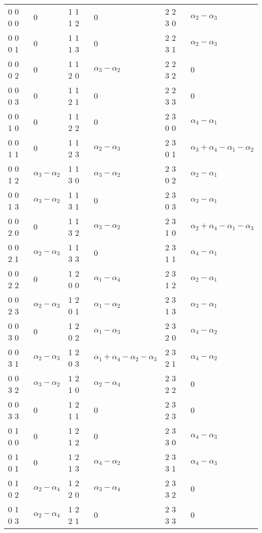 \begin{longtable}{|l|l|l|l|l|l|}
0 0 0 0 & \(0\) & 1 1 1 2 & \(0\) & 2 2 3 0 & \(\alpha_2 - \alpha_3\) \\ 
0 0 0 1 & \(0\) & 1 1 1 3 & \(0\) & 2 2 3 1 & \(\alpha_2 - \alpha_3\) \\ 
0 0 0 2 & \(0\) & 1 1 2 0 & \(\alpha_3 - \alpha_2\) & 2 2 3 2 & \(0\) \\ 
0 0 0 3 & \(0\) & 1 1 2 1 & \(0\) & 2 2 3 3 & \(0\) \\ 
0 0 1 0 & \(0\) & 1 1 2 2 & \(0\) & 2 3 0 0 & \(\alpha_4 - \alpha_1\) \\ 
0 0 1 1 & \(0\) & 1 1 2 3 & \(\alpha_2 - \alpha_3\) & 2 3 0 1 & \(\alpha_3 + \alpha_4 - \alpha_1 - \alpha_2\) \\ 
0 0 1 2 & \(\alpha_3 - \alpha_2\) & 1 1 3 0 & \(\alpha_3 - \alpha_2\) & 2 3 0 2 & \(\alpha_2 - \alpha_1\) \\ 
0 0 1 3 & \(\alpha_3 - \alpha_2\) & 1 1 3 1 & \(0\) & 2 3 0 3 & \(\alpha_3 - \alpha_1\) \\ 
0 0 2 0 & \(0\) & 1 1 3 2 & \(\alpha_3 - \alpha_2\) & 2 3 1 0 & \(\alpha_2 + \alpha_4 - \alpha_1 - \alpha_3\) \\ 
0 0 2 1 & \(\alpha_2 - \alpha_3\) & 1 1 3 3 & \(0\) & 2 3 1 1 & \(\alpha_4 - \alpha_1\) \\ 
0 0 2 2 & \(0\) & 1 2 0 0 & \(\alpha_1 - \alpha_4\) & 2 3 1 2 & \(\alpha_2 - \alpha_1\) \\ 
0 0 2 3 & \(\alpha_2 - \alpha_3\) & 1 2 0 1 & \(\alpha_1 - \alpha_2\) & 2 3 1 3 & \(\alpha_3 - \alpha_1\) \\ 
0 0 3 0 & \(0\) & 1 2 0 2 & \(\alpha_1 - \alpha_3\) & 2 3 2 0 & \(\alpha_4 - \alpha_2\) \\ 
0 0 3 1 & \(\alpha_2 - \alpha_3\) & 1 2 0 3 & \(\alpha_1 + \alpha_4 - \alpha_2 - \alpha_3\) & 2 3 2 1 & \(\alpha_4 - \alpha_2\) \\ 
0 0 3 2 & \(\alpha_3 - \alpha_2\) & 1 2 1 0 & \(\alpha_2 - \alpha_4\) & 2 3 2 2 & \(0\) \\ 
0 0 3 3 & \(0\) & 1 2 1 1 & \(0\) & 2 3 2 3 & \(0\) \\ 
0 1 0 0 & \(0\) & 1 2 1 2 & \(0\) & 2 3 3 0 & \(\alpha_4 - \alpha_3\) \\ 
0 1 0 1 & \(0\) & 1 2 1 3 & \(\alpha_4 - \alpha_2\) & 2 3 3 1 & \(\alpha_4 - \alpha_3\) \\ 
0 1 0 2 & \(\alpha_2 - \alpha_4\) & 1 2 2 0 & \(\alpha_3 - \alpha_4\) & 2 3 3 2 & \(0\) \\ 
0 1 0 3 & \(\alpha_2 - \alpha_4\) & 1 2 2 1 & \(0\) & 2 3 3 3 & \(0\) \\ 

\end{longtable}
